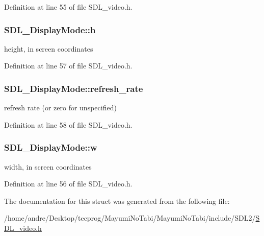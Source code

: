 Definition at line 55 of file S\-D\-L\-\_\-video.\-h.

\hypertarget{struct_s_d_l___display_mode_a0d9eabed50a560ed553af772c26632d7}{
\subsubsection[{h}]{ S\-D\-L\-\_\-\-Display\-Mode\-::h}}\label{struct_s_d_l___display_mode_a0d9eabed50a560ed553af772c26632d7}
height, in screen coordinates 

Definition at line 57 of file S\-D\-L\-\_\-video.\-h.

\hypertarget{struct_s_d_l___display_mode_ad1b5783c9b292ebf24ad4e0e7a98e540}{
\subsubsection[{refresh\-\_\-rate}]{ S\-D\-L\-\_\-\-Display\-Mode\-::refresh\-\_\-rate}}\label{struct_s_d_l___display_mode_ad1b5783c9b292ebf24ad4e0e7a98e540}
refresh rate (or zero for unspecified) 

Definition at line 58 of file S\-D\-L\-\_\-video.\-h.

\hypertarget{struct_s_d_l___display_mode_a504bb5e21950b719a0df43be51199046}{
\subsubsection[{w}]{ S\-D\-L\-\_\-\-Display\-Mode\-::w}}\label{struct_s_d_l___display_mode_a504bb5e21950b719a0df43be51199046}
width, in screen coordinates 

Definition at line 56 of file S\-D\-L\-\_\-video.\-h.



The documentation for this struct was generated from the following file\-:\begin{DoxyCompactItemize}
\item 
/home/andre/\-Desktop/tecprog/\-Mayumi\-No\-Tabi/\-Mayumi\-No\-Tabi/include/\-S\-D\-L2/\hyperlink{_s_d_l__video_8h}{S\-D\-L\-\_\-video.\-h}\end{DoxyCompactItemize}
